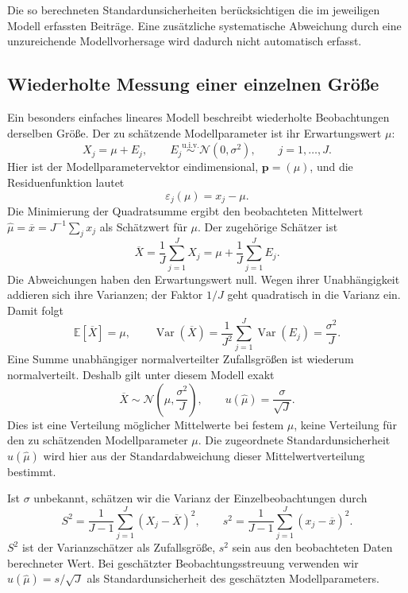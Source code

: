 Die so berechneten Standardunsicherheiten berücksichtigen die im
jeweiligen Modell erfassten Beiträge. Eine zusätzliche systematische
Abweichung durch eine unzureichende Modellvorhersage wird dadurch
nicht automatisch erfasst.

\subsection{Wiederholte Messung einer einzelnen Größe}
\label{V4Mittelwert}

Ein besonders einfaches lineares Modell beschreibt wiederholte
Beobachtungen derselben Größe. Der zu schätzende Modellparameter ist ihr Erwartungswert $\mu$:
\begin{equation}
X_j=\mu+E_j,\qquad
E_j\overset{\mathrm{u.i.v.}}{\sim}\mathcal N(0,\sigma^2),
\qquad j=1,\dots,J.
\label{T2Normalmodell}
\end{equation}
Hier ist der Modellparametervektor eindimensional, $\mathbf p=(\mu)$,
und die Residuenfunktion lautet
\begin{equation}
\varepsilon_j(\mu)=x_j-\mu.
\label{oneQuantityOnly1}
\end{equation}
Die Minimierung der Quadratsumme ergibt den beobachteten Mittelwert
$\widehat\mu=\overline x=J^{-1}\sum_j x_j$ als Schätzwert für $\mu$.
Der zugehörige Schätzer ist
\[
\overline X=\frac1J\sum_{j=1}^J X_j
=\mu+\frac1J\sum_{j=1}^J E_j.
\]
Die Abweichungen haben den Erwartungswert null. Wegen ihrer
Unabhängigkeit addieren sich ihre Varianzen; der Faktor $1/J$ geht
quadratisch in die Varianz ein. Damit folgt
\[
\mathbb E[\overline X]=\mu,\qquad
\operatorname{Var}(\overline X)
=\frac1{J^2}\sum_{j=1}^J\operatorname{Var}(E_j)
=\frac{\sigma^2}{J}.
\]
Eine Summe unabhängiger normalverteilter Zufallsgrößen ist wiederum
normalverteilt. Deshalb gilt unter diesem Modell exakt
\begin{equation}
\overline X\sim\mathcal N\!\left(\mu,\frac{\sigma^2}{J}\right),
\qquad u(\widehat\mu)=\frac{\sigma}{\sqrt J}.
\label{T2VerteilungMittelwert}
\end{equation}
Dies ist eine Verteilung möglicher Mittelwerte bei festem $\mu$,
keine Verteilung für den zu schätzenden Modellparameter $\mu$.
Die zugeordnete Standardunsicherheit $u(\widehat\mu)$ wird hier aus
der Standardabweichung dieser Mittelwertverteilung bestimmt.

Ist $\sigma$ unbekannt, schätzen wir die Varianz der Einzelbeobachtungen
durch
\[
S^2=\frac1{J-1}\sum_{j=1}^J(X_j-\overline X)^2,
\qquad
s^2=\frac1{J-1}\sum_{j=1}^J(x_j-\overline x)^2.
\]
$S^2$ ist der Varianzschätzer als Zufallsgröße, $s^2$ sein aus den
beobachteten Daten berechneter Wert. Bei geschätzter Beobachtungsstreuung
verwenden wir $u(\widehat\mu)=s/\sqrt J$ als Standardunsicherheit
des geschätzten Modellparameters.

